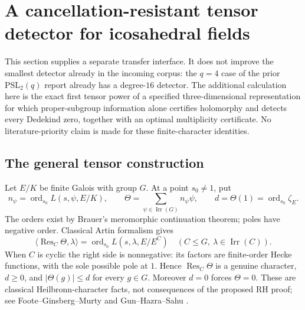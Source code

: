 \section{A cancellation-resistant tensor detector for icosahedral fields}
\label{sec:artin}

This section supplies a separate transfer interface. It does not improve the
smallest detector already in the incoming corpus: the $q=4$ case of the prior
$\mathrm{PSL}_2(q)$ report already has a degree-$16$ detector. The additional calculation
here is the exact first tensor power of a specified three-dimensional
representation for which proper-subgroup information alone certifies
holomorphy and detects every Dedekind zero, together with an optimal
multiplicity certificate. No literature-priority claim is made for these
finite-character identities.

\subsection{The general tensor construction}
Let $E/K$ be finite Galois with group $G$. At a point $s_0\ne1$, put
\[
 n_\psi=\operatorname{ord}_{s_0}L(s,\psi,E/K),\qquad
 \Theta=\sum_{\psi\in\operatorname{Irr}(G)}n_\psi\psi,\qquad
 d=\Theta(1)=\operatorname{ord}_{s_0}\zeta_E.
\]
The orders exist by Brauer's meromorphic continuation theorem; poles have
negative order. Classical Artin formalism gives
\[
 \langle\operatorname{Res}_C\Theta,\lambda\rangle
 =\operatorname{ord}_{s_0}L(s,\lambda,E/E^C)
 \quad(C\le G,\ \lambda\in\operatorname{Irr}(C)).
\]
When $C$ is cyclic the right side is nonnegative: its factors are finite-order
Hecke functions, with the sole possible pole at $1$. Hence
$\operatorname{Res}_C\Theta$ is a genuine character, $d\ge0$, and
$|\Theta(g)|\le d$ for every $g\in G$. Moreover $d=0$ forces $\Theta=0$.
These are classical Heilbronn-character facts, not consequences of the
proposed RH proof; see Foote--Ginsberg--Murty and Gun--Hazra--Sahu \cite{heilbronn,gun}.

